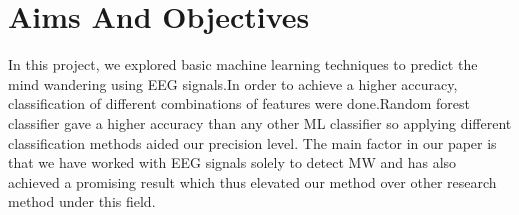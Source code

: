 \section{Aims And Objectives}

In this project, we explored basic machine learning techniques to predict the mind wandering using EEG signals.In order to achieve a higher accuracy, classification of different combinations of features were done.Random forest classifier gave a higher accuracy than any other ML classifier so applying different classification methods aided our precision level. The main factor in our paper is that we have worked with EEG signals solely to detect MW and has also achieved a promising result which thus elevated our method over other research method under this field.